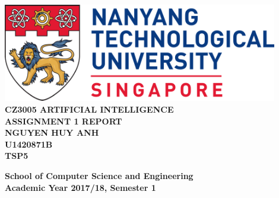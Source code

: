 \documentclass[11pt]{report}
\begin{document}
\begin{titlepage}
    \begin{center}
    
    \includegraphics[width=0.9\textwidth]{ntu_logo}
    \\[6cm]
    
    \uppercase{
    \textbf{CZ3005 Artificial Intelligence}\\
    \textbf{Assignment 1 Report}
    \\[2cm]
    \textbf{Nguyen Huy Anh}\\
    \textbf{U1420871B}\\
    \textbf{TSP5}
    }
    
    \vfill
    
    \textbf{School of Computer Science and Engineering}
    \\
    \textbf{Academic Year 2017/18, Semester 1}
    
    \end{center}
\end{titlepage}
\end{document}
